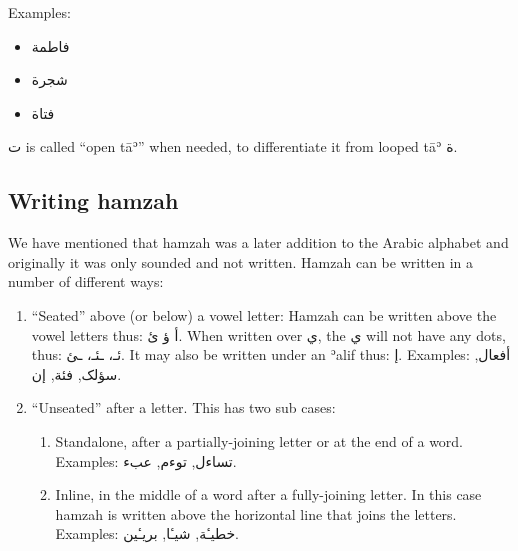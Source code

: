 \documentclass[
  10pt,
]{book}
\providecommand{\tightlist}{%
  \setlength{\itemsep}{0pt}\setlength{\parskip}{0pt}}
\begin{document}
Examples:

\begin{itemize}
\tightlist
\item
  \foreignlanguage{arabic}{فاطمة}
\item
  \foreignlanguage{arabic}{شجرة}
\item
  \foreignlanguage{arabic}{فتاة}
\end{itemize}

\foreignlanguage{arabic}{ت} is called \enquote{open tāʾ} when needed, to differentiate it from looped tāʾ \foreignlanguage{arabic}{ة}.

\subsection{Writing hamzah}\label{writing-hamzah}

We have mentioned that hamzah was a later addition to the Arabic alphabet and originally it was only sounded and not written. Hamzah can be written in a number of different ways:

\begin{enumerate}
\def\labelenumi{\arabic{enumi}.}
\tightlist
\item
  \enquote{Seated} above (or below) a vowel letter: Hamzah can be written above the vowel letters thus: \foreignlanguage{arabic}{أ ؤ ئ}. When written over \foreignlanguage{arabic}{ي}, the \foreignlanguage{arabic}{ي} will not have any dots, thus: \foreignlanguage{arabic}{ئـ، ـئـ، ـئ}. It may also be written under an ʾalif thus: \foreignlanguage{arabic}{إ}. Examples: \foreignlanguage{arabic}{أفعال}, \foreignlanguage{arabic}{سؤلک}, \foreignlanguage{arabic}{فئة}, \foreignlanguage{arabic}{إن}.
\item
  \enquote{Unseated} after a letter. This has two sub cases:

  \begin{enumerate}
  \def\labelenumii{\alph{enumii}.}
  \tightlist
  \item
    Standalone, after a partially-joining letter or at the end of a word. Examples: \foreignlanguage{arabic}{تساءل}, \foreignlanguage{arabic}{توءم}, \foreignlanguage{arabic}{عبء}.
  \item
    Inline, in the middle of a word after a fully-joining letter. In this case hamzah is written above the horizontal line that joins the letters. Examples: \foreignlanguage{arabic}{خطيـٔة}, \foreignlanguage{arabic}{شيـٔا}, \foreignlanguage{arabic}{بريـٔين}.
  \end{enumerate}
\end{enumerate}
\end{document}
